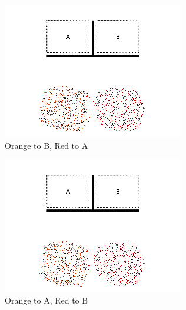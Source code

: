 \documentclass[]{article}
\begin{document}
\begin{figure}
\begin{subfigure}{0.42\textwidth}
		\includegraphics[width=\linewidth]{slide_images/Swarm_Robot_Control_-_1000_Robot_0011.png}
		\caption{Orange to B, Red to A}
		\label{fig:sub1}
	\end{subfigure}%
	\begin{subfigure}{0.42\textwidth}
		\centering
		\includegraphics[width=\linewidth]{slide_images/Swarm_Robot_Control_-_1000_Robot_0013.png}
		\caption{Orange to A, Red to B}
		\label{fig:sub2}
	\end{subfigure}
	\begin{subfigure}{0.42\textwidth}
		\centering

\end{subfigure}
\end{figure}
\end{document}
